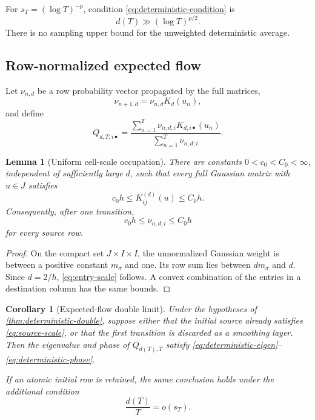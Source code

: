 \documentclass[11pt]{article}
\newtheorem{lemma}[theorem]{Lemma}
\newtheorem{corollary}[theorem]{Corollary}
\theoremstyle{definition}
\theoremstyle{remark}
\begin{document}
For $s_T=(\log T)^{-p}$, condition \eqref{eq:deterministic-condition} is
\begin{equation}\label{eq:lower-window}
  d(T)\gg(\log T)^{p/2}.
\end{equation}
There is no sampling upper bound for the unweighted deterministic average.

\subsection{Row-normalized expected flow}

Let $\nu_{n,d}$ be a row probability vector propagated by the full matrices,
\[
  \nu_{n+1,d}=\nu_{n,d}K_d(u_n),
\]
and define
\begin{equation}\label{eq:expected-flow}
  Q_{d,T;i\bullet}
  =
  \frac{\sum_{n=1}^T\nu_{n,d;i}K_{d;i\bullet}(u_n)}
       {\sum_{n=1}^T\nu_{n,d;i}}.
\end{equation}

\begin{lemma}[Uniform cell-scale occupation]\label{lem:cell-occupation}
There are constants $0<c_0<C_0<\infty$, independent of sufficiently large
$d$, such that every full Gaussian matrix with $u\in J$ satisfies
\begin{equation}\label{eq:entry-scale}
  c_0h\le K_{ij}^{(d)}(u)\le C_0h.
\end{equation}
Consequently, after one transition,
\begin{equation}\label{eq:source-scale}
  c_0h\le\nu_{n,d;i}\le C_0h
\end{equation}
for every source row.
\end{lemma}

\begin{proof}
On the compact set $J\times I\times I$, the unnormalized Gaussian weight is
between a positive constant $m_\sigma$ and one.  Its row sum lies between
$dm_\sigma$ and $d$.  Since $d=2/h$, \eqref{eq:entry-scale} follows.
A convex combination of the entries in a destination column has the same
bounds.
\end{proof}

\begin{corollary}[Expected-flow double limit]\label{cor:expected-double}
Under the hypotheses of \cref{thm:deterministic-double}, suppose either that
the initial source already satisfies \eqref{eq:source-scale}, or that the first
transition is discarded as a smoothing layer.  Then the eigenvalue and phase
of $Q_{d(T),T}$ satisfy
\eqref{eq:deterministic-eigen}--\eqref{eq:deterministic-phase}.

If an atomic initial row is retained, the same conclusion holds under the
additional condition
\begin{equation}\label{eq:initial-layer}
  \frac{d(T)}T=o(s_T).
\end{equation}
\end{corollary}
\end{document}
